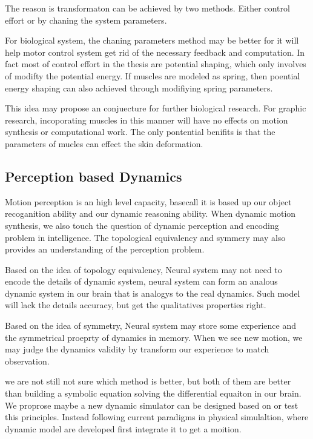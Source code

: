 The reason is transformaton can be achieved by two methods.
Either control effort or by chaning the system parameters.

For biological system, the chaning parameters method may be better for it will help motor control system get rid of the necessary feedback and computation. 
In fact most of control effort in the thesis are potential shaping, which only involves of modifty the potential energy.
If muscles are modeled as spring, then poential energy shaping can also achieved through modifiying spring parameters.

This idea may propose an conjuecture for further biological research.
For graphic research, incoporating muscles in this manner will have no effects on motion synthesis or computational work.
The only pontential benifits is that the parameters of mucles can effect the skin deformation.



\subsection{Perception based Dynamics}
Motion perception is an high level capacity, basecall it is based up our object recoganition ability and our dynamic reasoning ability.
When dynamic motion synthesis, we also touch the question of dynamic perception and encoding problem in intelligence.
The topological equivalency and symmery may also provides an understanding of the perception problem.

Based on the idea of topology equivalency,
Neural system may not need to encode the details of dynamic system, neural system can form an analous dynamic system in our brain that is analogys to the real dynamics.
Such model will lack the details accuracy, but get the qualitatives properties right.

Based on the idea of symmetry,
Neural system may store some experience and the symmetrical proeprty of dynamics in memory.
When we see new motion, we may judge the dynamics validity by transform our experience to match observation.


we are not still not sure which method is better, but both of them are better than building a symbolic equation solving the differential equaiton in our brain.
We proprose maybe a new dynamic simulator can be designed based on or test this principles.
Instead following current paradigms in physical simulaltion, where dynamic model are developed first integrate it to get a moition.

